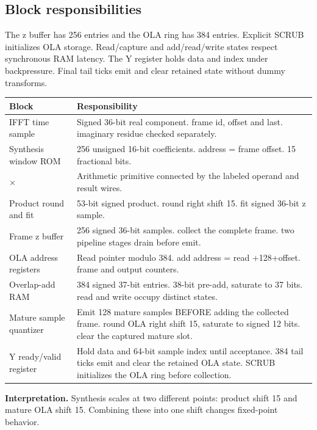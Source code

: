 \documentclass[11pt,letterpaper]{article}
\begin{document}
\subsection*{Block responsibilities}
The z buffer has 256 entries and the OLA ring has 384 entries. Explicit SCRUB initializes OLA storage. Read/capture and add/read/write states respect synchronous RAM latency. The Y register holds data and index under backpressure. Final tail ticks emit and clear retained state without dummy transforms.
\par\medskip\noindent
\begin{tabularx}{\linewidth}{@{}>{\raggedright\arraybackslash}p{1.65in}Y@{}}\toprule
\textbf{Block} & \textbf{Responsibility} \\ \midrule
IFFT time sample & Signed 36-bit real component. frame id, offset and last. imaginary residue checked separately. \\[5pt]
Synthesis window ROM & 256 unsigned 16-bit coefficients. address = frame offset. 15 fractional bits. \\[5pt]
× & Arithmetic primitive connected by the labeled operand and result wires. \\[5pt]
Product round and fit & 53-bit signed product. round right shift 15. fit signed 36-bit z sample. \\[5pt]
Frame z buffer & 256 signed 36-bit samples. collect the complete frame. two pipeline stages drain before emit. \\[5pt]
OLA address registers & Read pointer modulo 384. add address = read +128+offset. frame and output counters. \\[5pt]
Overlap-add RAM & 384 signed 37-bit entries. 38-bit pre-add, saturate to 37 bits. read and write occupy distinct states. \\[5pt]
Mature sample quantizer & Emit 128 mature samples BEFORE adding the collected frame. round OLA right shift 15, saturate to signed 12 bits. clear the captured mature slot. \\[5pt]
Y ready/valid register & Hold data and 64-bit sample index until acceptance. 384 tail ticks emit and clear the retained OLA state. SCRUB initializes the OLA ring before collection. \\[5pt]
\bottomrule\end{tabularx}
\vspace{8pt}
\noindent\textbf{Interpretation.} Synthesis scales at two different points: product shift 15 and mature OLA shift 15. Combining these into one shift changes fixed-point behavior.
\clearpage
\end{document}
